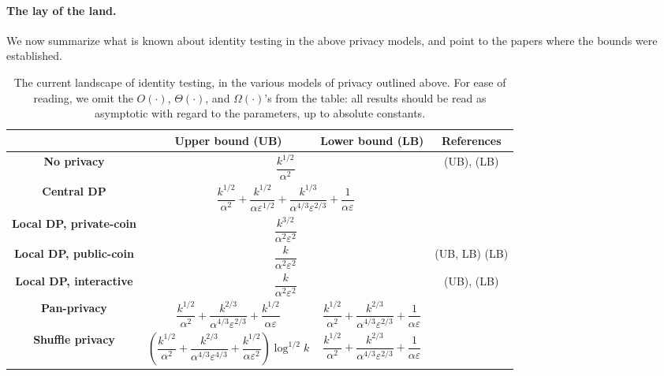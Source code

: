 \documentclass[10pt]{article}
\newcommand{\dst}{\alpha}
\newcommand{\ab}{k}
\newcommand{\priv}{\varepsilon}
\begin{document}
\paragraph{The lay of the land.}
We now summarize what is known about identity testing in the above privacy models, and point to the papers where the bounds were established.
\begin{table}[H]\centering
  \def\arraystretch{2.75}%
  \begin{adjustwidth}{-0.5in}{1in}%
  \begin{tabular}{|c|c|c|c|}
  \hline
     & \bf Upper bound (UB) & \bf Lower bound (LB) & \bf References \\\hline
    \bf No privacy & \multicolumn{2}{c|}{$\dfrac{\ab^{1/2}}{\dst^2}$} & \cite{ValiantV17} (UB), \cite{Paninski08} (LB) \\\hline
    \bf Central DP & \multicolumn{2}{c|}{$\dfrac{\ab^{1/2}}{\dst^2}+\dfrac{\ab^{1/2}}{\dst\priv^{1/2}}+\dfrac{\ab^{1/3}}{\dst^{4/3}\priv^{2/3}}+\dfrac{1}{\dst\priv}$} & \cite{AcharyaSZ18,AliakbarpourDR18} \\\hline
    \bf Local DP, private-coin & \multicolumn{2}{c|}{$\dfrac{\ab^{3/2}}{\dst^2\priv^2}$} & \cite{AcharyaCFT19,AcharyaCT19,AcharyaCHST19}\footnotemark \\\hline
    \bf Local DP, public-coin & \multicolumn{2}{c|}{$\dfrac{\ab}{\dst^2\priv^2}$} & \cite{AcharyaCFT19} (UB, LB) \cite{AcharyaCT19} (LB) \\\hline
    \bf Local DP, interactive & \multicolumn{2}{c|}{$\dfrac{\ab}{\dst^2\priv^2}$} & \cite{AcharyaCFT19} (UB), \cite{KareemMJ19} (LB) \\\hline
    \bf Pan-privacy 
    & $\dfrac{\ab^{1/2}}{\dst^2}+\dfrac{\ab^{2/3}}{\dst^{4/3}\priv^{2/3}}+\dfrac{\ab^{1/2}}{\dst\priv}$ 
    & $\dfrac{\ab^{1/2}}{\dst^2}+\dfrac{\ab^{2/3}}{\dst^{4/3}\priv^{2/3}}+\dfrac{1}{\dst\priv}$ 
    & \cite{KareemMJ19} \\\hline
    \bf Shuffle privacy & $\left(\dfrac{\ab^{1/2}}{\dst^2}+\dfrac{\ab^{2/3}}{\dst^{4/3}\priv^{4/3}}+\dfrac{\ab^{1/2}}{\dst\priv^2}\right)\log^{1/2}\ab$ 
    & $\dfrac{\ab^{1/2}}{\dst^2}+\dfrac{\ab^{2/3}}{\dst^{4/3}\priv^{2/3}}+\dfrac{1}{\dst\priv}$ & \cite{BalcerCJM20} \\\hline
  \end{tabular}
  \end{adjustwidth}
  \caption{The current landscape of identity testing, in the various models of privacy outlined above. For ease of reading, we omit the $O(\cdot)$, $\Theta(\cdot)$, and $\Omega(\cdot)$'s from the table: all results should be read as asymptotic with regard to the parameters, up to absolute constants.}
\end{table}
\end{document}

